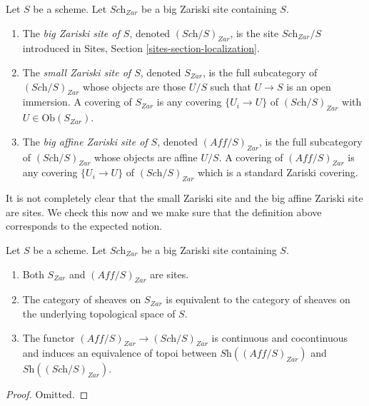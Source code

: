 \begin{definition}
\label{definition-big-small-Zariski}
Let $S$ be a scheme. Let $\textit{Sch}_{Zar}$ be a big Zariski
site containing $S$.
\begin{enumerate}
\item The {\it big Zariski site of $S$}, denoted
$(\textit{Sch}/S)_{Zar}$, is the site $\textit{Sch}_{Zar}/S$
introduced in Sites, Section \ref{sites-section-localization}.
\item The {\it small Zariski site of $S$}, denoted
$S_{Zar}$, is the full subcategory of $(\textit{Sch}/S)_{Zar}$
whose objects are those $U/S$ such that $U \to S$ is an open immersion.
A covering of $S_{Zar}$ is any covering $\{U_i \to U\}$ of
$(\textit{Sch}/S)_{Zar}$ with $U \in \text{Ob}(S_{Zar})$.
\item The {\it big affine Zariski site of $S$}, denoted
$(\textit{Aff}/S)_{Zar}$, is the full subcategory of
$(\textit{Sch}/S)_{Zar}$ whose objects are affine $U/S$.
A covering of $(\textit{Aff}/S)_{Zar}$ is any covering
$\{U_i \to U\}$ of $(\textit{Sch}/S)_{Zar}$ which is a
standard Zariski covering.
\end{enumerate}
\end{definition}

\noindent
It is not completely clear that the small Zariski site and
the big affine Zariski site are sites. We check this now
and we make sure that the definition above corresponds to
the expected notion.

\begin{lemma}
\label{lemma-verify-site-Zariski}
Let $S$ be a scheme. Let $\textit{Sch}_{Zar}$ be a big Zariski
site containing $S$.
\begin{enumerate}
\item Both $S_{Zar}$ and $(\textit{Aff}/S)_{Zar}$ are sites.
\item The category of sheaves on $S_{Zar}$ is equivalent to the
category of sheaves on the underlying topological space of $S$.
\item The functor $(\textit{Aff}/S)_{Zar} \to (\textit{Sch}/S)_{Zar}$
is continuous and cocontinuous and induces an equivalence of topoi
between
$\textit{Sh}((\textit{Aff}/S)_{Zar})$ and
$\textit{Sh}((\textit{Sch}/S)_{Zar})$.
\end{enumerate}
\end{lemma}

\begin{proof}
Omitted.
\end{proof}













